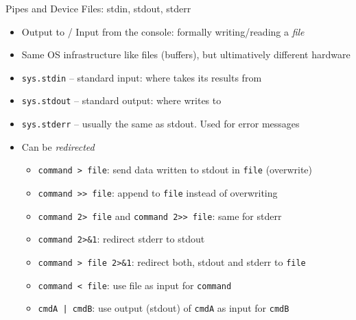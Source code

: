 \begin{frame}{Pipes and Device Files: stdin, stdout, stderr}
%
\begin{itemize}
\item Output to / Input from the console: formally writing/reading a \emph{file}
\item Same OS infrastructure like files (\eg buffers), but ultimatively different hardware
\item \texttt{sys.stdin} -- standard input: where  takes its results from
\item \texttt{sys.stdout} -- standard output: where  writes to
\item \texttt{sys.stderr} -- usually the same as stdout. Used for error messages
\item Can be \emph{redirected}
	\begin{itemize}
	\item \texttt{command > file}: send data written to stdout in \texttt{file} (overwrite)
	\item \texttt{command >{}> file}: append to \texttt{file} instead of overwriting
	\item \texttt{command 2> file} and \texttt{command 2>{}> file}: same for stderr
	\item \texttt{command 2>\&1}: redirect stderr to stdout
	\item \texttt{command > file 2>\&1}: redirect both, stdout and stderr to \texttt{file}
	\item \texttt{command < file}: use file as input for \texttt{command}
	\item \texttt{cmdA | cmdB}: use output (stdout) of \texttt{cmdA} as input for \texttt{cmdB}
	\end{itemize}
\end{itemize}
%
\end{frame}


